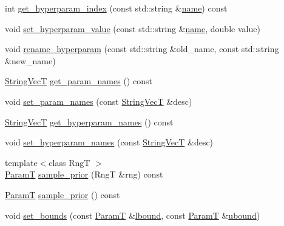 \begin{DoxyCompactItemize}
\item 
int \hyperlink{classmappel_1_1PointEmitterModel_ae13aa99689266d870b659d1045d595f1}{get\+\_\+hyperparam\+\_\+index} (const std\+::string \&\hyperlink{classmappel_1_1Gauss2DsMAP_adb290940195572b2e22c3c8fce3f11c9}{name}) const 
\item 
void \hyperlink{classmappel_1_1PointEmitterModel_ade3e56cc00c43e9b7a521d8c4778d3b7}{set\+\_\+hyperparam\+\_\+value} (const std\+::string \&\hyperlink{classmappel_1_1Gauss2DsMAP_adb290940195572b2e22c3c8fce3f11c9}{name}, double value)
\item 
void \hyperlink{classmappel_1_1PointEmitterModel_a447c83f0769e6dea2bfad68d957287d0}{rename\+\_\+hyperparam} (const std\+::string \&old\+\_\+name, const std\+::string \&new\+\_\+name)
\item 
\hyperlink{namespacemappel_aae88cf18bccfbb789a6019bcfbbfca68}{String\+VecT} \hyperlink{classmappel_1_1PointEmitterModel_aa910d1137d808041c0601f2dd3db96f0}{get\+\_\+param\+\_\+names} () const 
\item 
void \hyperlink{classmappel_1_1PointEmitterModel_a2abccbca47fc60700d73244e6c4dbe30}{set\+\_\+param\+\_\+names} (const \hyperlink{namespacemappel_aae88cf18bccfbb789a6019bcfbbfca68}{String\+VecT} \&desc)
\item 
\hyperlink{namespacemappel_aae88cf18bccfbb789a6019bcfbbfca68}{String\+VecT} \hyperlink{classmappel_1_1PointEmitterModel_a1b8bbd4bdddfb8f5236e8e50fe546c36}{get\+\_\+hyperparam\+\_\+names} () const 
\item 
void \hyperlink{classmappel_1_1PointEmitterModel_a6cdba258bda50cff162dc16a49383bb0}{set\+\_\+hyperparam\+\_\+names} (const \hyperlink{namespacemappel_aae88cf18bccfbb789a6019bcfbbfca68}{String\+VecT} \&desc)
\item 
{\footnotesize template$<$class RngT $>$ }\\\hyperlink{classmappel_1_1PointEmitterModel_a665ec6aea3aac139bb69a23c06d4b9a1}{ParamT} \hyperlink{classmappel_1_1PointEmitterModel_ae69bf3df2c94b351015bbf81e52dfe03}{sample\+\_\+prior} (RngT \&rng) const 
\item 
\hyperlink{classmappel_1_1PointEmitterModel_a665ec6aea3aac139bb69a23c06d4b9a1}{ParamT} \hyperlink{classmappel_1_1PointEmitterModel_abd9d2923ca9a838897a9b26bfb3ce073}{sample\+\_\+prior} () const 
\item 
void \hyperlink{classmappel_1_1PointEmitterModel_a31f139d9eb58f210f3359a9f5be9dd15}{set\+\_\+bounds} (const \hyperlink{classmappel_1_1PointEmitterModel_a665ec6aea3aac139bb69a23c06d4b9a1}{ParamT} \&\hyperlink{classmappel_1_1PointEmitterModel_a889bc82f74cfa654da121e5770296ab2}{lbound}, const \hyperlink{classmappel_1_1PointEmitterModel_a665ec6aea3aac139bb69a23c06d4b9a1}{ParamT} \&\hyperlink{classmappel_1_1PointEmitterModel_a35b883e84b6a2e0093bdf482c623beef}{ubound})

\end{DoxyCompactItemize}
